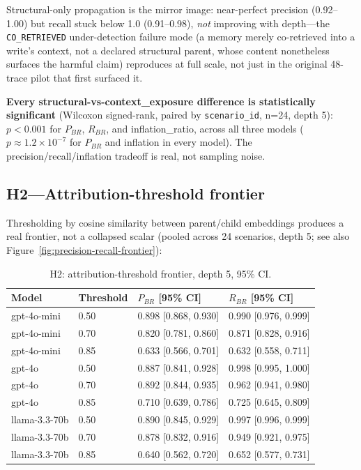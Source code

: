 Structural-only propagation is the mirror image: near-perfect precision
(0.92--1.00) but recall stuck below 1.0 (0.91--0.98), \emph{not}
improving with depth---the \texttt{CO\_RETRIEVED} under-detection
failure mode (a memory merely co-retrieved into a write's context, not
a declared structural parent, whose content nonetheless surfaces the
harmful claim) reproduces at full scale, not just in the original
48-trace pilot that first surfaced it.

\textbf{Every structural-vs-context\_exposure difference is
statistically significant} (Wilcoxon signed-rank, paired by
\texttt{scenario\_id}, n=24, depth 5): $p < 0.001$ for $P_{BR}$,
$R_{BR}$, and inflation\_ratio, across all three models
($p \approx 1.2 \times 10^{-7}$ for $P_{BR}$ and inflation in every
model). The precision/recall/inflation tradeoff is real, not sampling
noise.

\subsection{H2---Attribution-threshold frontier}

Thresholding by cosine similarity between parent/child embeddings
produces a real frontier, not a collapsed scalar (pooled across 24
scenarios, depth 5; see also Figure~\ref{fig:precision-recall-frontier}):

\begin{table}[h]
\centering
\caption{H2: attribution-threshold frontier, depth 5, 95\% CI.}
\label{tab:h2}
\begin{tabular}{llll}
\toprule
Model & Threshold & $P_{BR}$ [95\% CI] & $R_{BR}$ [95\% CI] \\
\midrule
gpt-4o-mini & 0.50 & 0.898 [0.868, 0.930] & 0.990 [0.976, 0.999] \\
gpt-4o-mini & 0.70 & 0.820 [0.781, 0.860] & 0.871 [0.828, 0.916] \\
gpt-4o-mini & 0.85 & 0.633 [0.566, 0.701] & 0.632 [0.558, 0.711] \\
gpt-4o & 0.50 & 0.887 [0.841, 0.928] & 0.998 [0.995, 1.000] \\
gpt-4o & 0.70 & 0.892 [0.844, 0.935] & 0.962 [0.941, 0.980] \\
gpt-4o & 0.85 & 0.710 [0.639, 0.786] & 0.725 [0.645, 0.809] \\
llama-3.3-70b & 0.50 & 0.890 [0.845, 0.929] & 0.997 [0.996, 0.999] \\
llama-3.3-70b & 0.70 & 0.878 [0.832, 0.916] & 0.949 [0.921, 0.975] \\
llama-3.3-70b & 0.85 & 0.640 [0.562, 0.720] & 0.652 [0.577, 0.731] \\
\bottomrule
\end{tabular}
\end{table}

